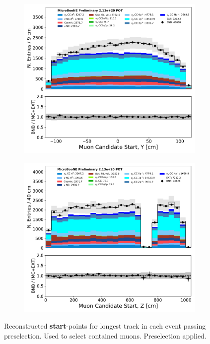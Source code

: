 \begin{figure}[H]
\begin{subfigure}[b]{0.3\textwidth}
        \includegraphics[width=\textwidth]{NuMuCCsel/Images/Ryan/appendix_muonsel_input_R3/trk_sce_start_y_v_07232020_presel_samples_detsys_event_category.pdf}
        \end{subfigure}
        \begin{subfigure}[b]{0.3\textwidth}
        \centering
        \includegraphics[width=\textwidth]{NuMuCCsel/Images/Ryan/appendix_muonsel_input_R3/trk_sce_start_z_v_07232020_presel_samples_detsys_event_category.pdf}
        \end{subfigure}
    \caption{Reconstructed \textbf{start}-points for longest track in each event passing preselection. Used to select contained muons. Preselection applied.}
    \label{fig::Appendix::constraint:inputvars:startpoints}
\end{figure}

